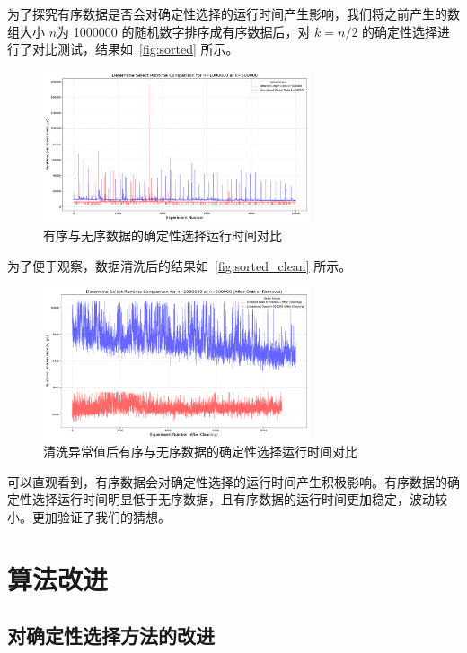 为了探究有序数据是否会对确定性选择的运行时间产生影响，我们将之前产生的数组大小 $n$为 1000000 的随机数字排序成有序数据后，对 $k = n / 2$ 的确定性选择进行了对比测试，结果如~\autoref{fig:sorted} 所示。
\begin{figure}[htbp]
    \centering
    \includegraphics[width=0.7\textwidth]{../figure/determine_continue_order_vs_unorder.png}
    \caption{有序与无序数据的确定性选择运行时间对比}
    \label{fig:sorted}
\end{figure}

为了便于观察，数据清洗后的结果如~\autoref{fig:sorted_clean} 所示。
\begin{figure}[htbp]
    \centering
    \includegraphics[width=0.7\textwidth]{../figure/determine_continue_order_vs_unorder_cleaned.png}
    \caption{清洗异常值后有序与无序数据的确定性选择运行时间对比}
    \label{fig:sorted_clean}
\end{figure}

可以直观看到，有序数据会对确定性选择的运行时间产生积极影响。有序数据的确定性选择运行时间明显低于无序数据，且有序数据的运行时间更加稳定，波动较小。更加验证了我们的猜想。
\section{算法改进}

\subsection{对确定性选择方法的改进}

